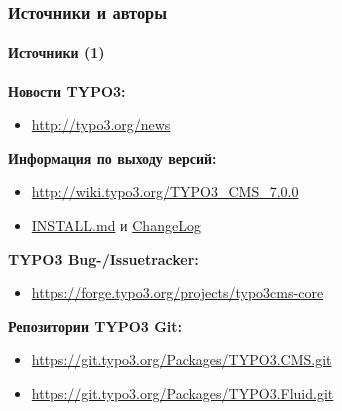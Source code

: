 \begin{frame}[fragile]
	\frametitle{Источники и авторы}
	\framesubtitle{Источники (1)}

	\textbf{Новости TYPO3:}
		\begin{itemize}\smaller
			\item \url{http://typo3.org/news}
		\end{itemize}

	\textbf{Информация по выходу версий:}
		\begin{itemize}\smaller
			\item \url{http://wiki.typo3.org/TYPO3_CMS_7.0.0}
			\item \href{https://github.com/TYPO3/TYPO3.CMS/blob/master/INSTALL.md}{INSTALL.md} и \href{https://github.com/TYPO3/TYPO3.CMS/blob/master/ChangeLog}{ChangeLog}
		\end{itemize}

	\textbf{TYPO3 Bug-/Issuetracker:}
		\begin{itemize}\smaller
			\item \url{https://forge.typo3.org/projects/typo3cms-core}
		\end{itemize}

	\textbf{Репозитории TYPO3 Git:}
		\begin{itemize}\smaller
			\item \url{https://git.typo3.org/Packages/TYPO3.CMS.git}
			\item \url{https://git.typo3.org/Packages/TYPO3.Fluid.git}
		\end{itemize}

\end{frame}


